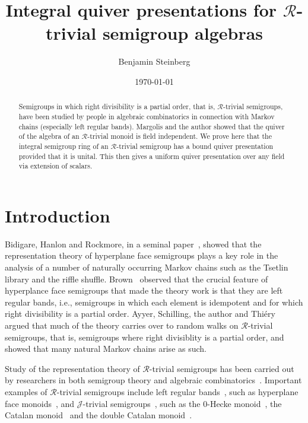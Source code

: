 \documentclass[reqno,11pt]{amsart}
\title[Integral quiver presentations]{Integral quiver presentations for $\mathscr R$-trivial semigroup algebras}
\author{Benjamin Steinberg}
\date{\today}
\newcommand{\R}{\mathrel{\mathscr R}} %
\numberwithin{equation}{section}
\begin{document}
\begin{abstract}
Semigroups in which right divisibility is a partial order, that is, $\R$-trivial semigroups, have been studied by people in algebraic combinatorics in connection with Markov chains (especially left regular bands).  Margolis and the author showed that the quiver of the algebra of an $\R$-trivial monoid is field independent.  We prove here that the integral semigroup ring of an $\R$-trivial semigroup has a bound quiver presentation provided that it is unital.   This then gives a uniform quiver presentation over any field via extension of scalars. 
\end{abstract}
\maketitle

\section{Introduction}

Bidigare, Hanlon and Rockmore, in a seminal paper~\cite{BHR}, showed that the representation theory of hyperplane face semigroups plays a key role in the analysis of a number of naturally occurring Markov chains such as the Tsetlin library and the riffle shuffle.  Brown~\cite{Brown} observed that the crucial feature of hyperplance face semigroups that made the theory work is that they are left regular bands, i.e., semigroups in which each element is idempotent and for which right divisibility is a partial order.  Ayyer, Schilling, the author and Thi\'ery~\cite{ayyer_schilling_steinberg_thiery.2013,ayyer_schilling_steinberg_thiery.sandpile.2013} argued that much of the theory carries over to random walks on $\mathscr R$-trivial semigroups, that is, semigroups where right divisiblity is a partial order, and showed that many natural Markov chains arise as such.

Study of the representation theory of $\R$-trivial semigroups has been carried out by researchers in both semigroup theory and algebraic combinatorics~\cite{SchockerRtrivial,BergeronSaliola,DO,repbook}.  Important examples of $\mathscr R$-trivial semigroups include left regular bands~\cite{Brown1,ourmemoirs,MSS}, such as hyperplane face monoids~\cite{BHR}, and $\mathscr J$-trivial semigroups~\cite{Jtrivialpaper}, such as the $0$-Hecke monoid~\cite{Carter0Hecke,Jtrivialpaper}, the Catalan monoid~\cite{catalan} and the double Catalan monoid~\cite{DoubleCatalan}.
\end{document}
